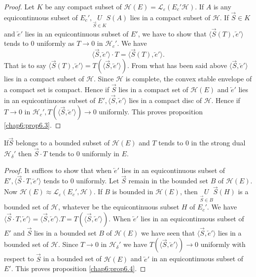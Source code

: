 \begin{proof}
Let $K$ be any compact subset of $\mathscr{H}(E) =
\mathscr{L}_{\varepsilon}(E_c' \mathscr{H})$. If $A$ is any
equicontinuous subset of $E_c', \underset{\vec{S} \in K}{U}
S(A)$ lies in a compact subset of $\mathscr{H}$. If
$\overrightarrow{S} \in K$ and $\overleftarrow{e}'$ lies in an
equicontinuous subset of $E'$, we have to show that $\langle
\overrightarrow{S} (T), \overleftarrow{e}'\rangle$ tends to $0$
uniformly as $T \to 0$ in $\mathscr{H}_c'$. We have
$$
\langle \overrightarrow{S}, \overleftarrow{e}' \rangle \cdot T = \langle
\overrightarrow{S} (T), \overleftarrow{e}' \rangle.
$$
That is to say $\langle \overrightarrow{S} (T), \overleftarrow{e}'
\rangle = T(\langle \overrightarrow{S}, \overleftarrow{e}'\rangle)$. 
From what has been said above $\langle \overrightarrow{S},
\overleftarrow{e}'\rangle$ lies in a compact subset of
$\mathscr{H}$. Since $\mathscr{H}$ is complete, the convex stable
envelope of a compact set is compact. Hence if $\overrightarrow{S}$
lies in a compact set of $\mathscr{H}(E)$ and $\overleftarrow{e}'$
lies in an equicontinuous subset of $E', \langle \overrightarrow{S},
\overleftarrow{e}' \rangle$ lies in a compact disc of
$\mathscr{H}$. Hence if $T \to 0$ in $\mathscr{H}_c', T(\langle
\overrightarrow{S}, \overleftarrow{e}' \rangle) \to 0$ uniformly. This
proves proposition \ref{chap6:prop6.3}.
\end{proof}

\begin{prop}\label{chap6:prop6.4}
If\pageoriginale $\overrightarrow{S}$ belongs to a bounded subset of
$\mathscr{H}(E)$ and $T$ tends to $0$ in the strong dual
$\mathscr{H}_\delta'$ then $\overrightarrow{S} \cdot T$ tends to $0$
uniformly in $E$.
\end{prop}

\begin{proof}
It suffices to show that when $\overleftarrow{e}'$ lies in an
equicontinuous subset of $E', \langle \overrightarrow{S} \cdot T,
\overleftarrow{e}' \rangle$ tends to $0$ uniformly. Let
$\overrightarrow{S}$ remain in the bounded set $B$ of
$\mathscr{H}(E)$. Now $\mathscr{H}(E) \approx
\mathscr{L}_\varepsilon(E_c', \mathscr{H})$. If $B$ is bounded in
$\mathscr{H}(E)$, then $\underset{\vec{S}\in B}{U}
\overrightarrow{S}(H)$ is a bounded set of $\mathscr{H}$, whatever be
the equicontinuous subset $H$ of $E_c'$. We have $\langle
\overrightarrow{S} \cdot T, \overleftarrow{e}' \rangle = \langle
\overrightarrow{S}, \overleftarrow{e}' \rangle . T = T (\langle
\overrightarrow{S}, \overleftarrow{e}' \rangle)$. When
$\overleftarrow{e}'$ lies in an equicontinuous subset of $E'$ and
$\overrightarrow{S}$ lies in a bounded set $B$ of $\mathscr{H}(E)$ we
have seen that $\langle \overrightarrow{S}, \overleftarrow{e}'
\rangle$ lies in a bounded set of $\mathscr{H}$. Since $T \to 0$ in
$\mathscr{H}_\delta'$ we have $T(\langle \overrightarrow{S},
\overleftarrow{e}' \rangle) \to 0$ uniformly with respect to
$\overrightarrow{S}$ in a bounded set of $\mathscr{H}(E)$ and
$\overleftarrow{e}'$ in an equicontinuous subset of $E'$. This proves
proposition \ref{chap6:prop6.4}.
\end{proof}


